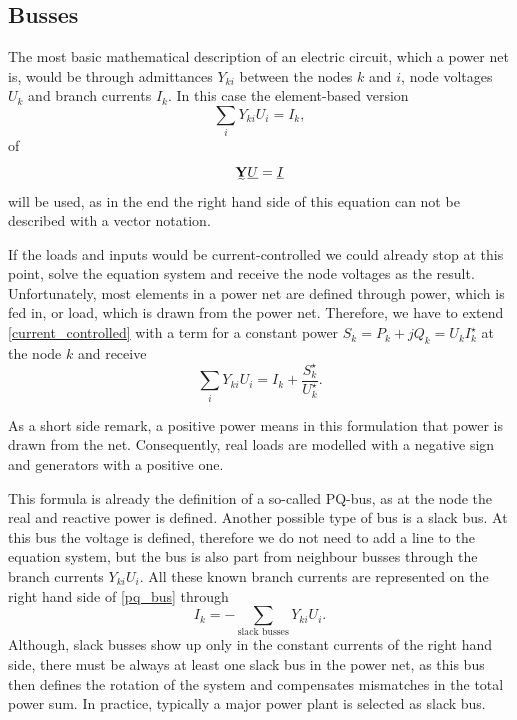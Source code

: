 \subsection{Busses}

The most basic mathematical description of an electric circuit, which a power net is, would be through admittances $Y_{ki}$ between the nodes $k$ and $i$, node voltages $U_k$ and branch currents $I_k$. In this case the element-based version
\begin{equation}
	\sum_i Y_{ki} U_i = I_k,
	\label{eq:current_controlled}
\end{equation}
of
\begin{equation}
	\mat Y \vec U = \vec I
\end{equation}
will be used, as in the end the right hand side of this equation can not be described with a vector notation.

If the loads and inputs would be current-controlled we could already stop at this point, solve the equation system and receive the node voltages as the result. Unfortunately, most elements in a power net are defined through power, which is fed in, or load, which is drawn from the power net. Therefore, we have to extend \eqref{current_controlled} with a term for a constant power $S_k = P_k + j Q_k = U_k I_k^\star$ at the node $k$ and receive
\begin{equation}
	\sum_i Y_{ki} U_i = I_k + \frac{S_k^\star}{U_k^\star}.
	\label{eq:pq_bus}
\end{equation}

As a short side remark, a positive power means in this formulation that power is drawn from the net. Consequently, real loads are modelled with a negative sign and generators with a positive one.

This formula is already the definition of a so-called PQ-bus, as at the node the real and reactive power is defined. Another possible type of bus is a slack bus. At this bus the voltage is defined, therefore we do not need to add a line to the equation system, but the bus is also part from neighbour busses through the branch currents $Y_{ki} U_i$. All these known branch currents are represented on the right hand side of \eqref{pq_bus} through
\begin{equation}
	I_k = -\sum_{\text{slack busses}} Y_{ki} U_i.
\end{equation}
Although, slack busses show up only in the constant currents of the right hand side, there must be always at least one slack bus in the power net, as this bus then defines the rotation of the system and compensates mismatches in the total power sum. In practice, typically a major power plant is selected as slack bus.

